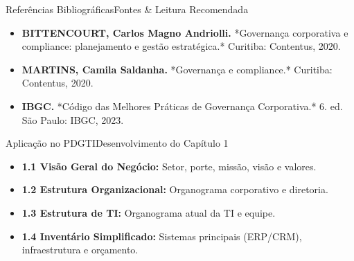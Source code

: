 \begin{senaiframe}{Referências Bibliográficas}{Fontes \& Leitura Recomendada}
  \begin{tcolorbox}[senaicard, title={Obras de Referência}]
    \begin{itemize}
      \item \textbf{BITTENCOURT, Carlos Magno Andriolli.} *Governança corporativa e compliance: planejamento e gestão estratégica.* Curitiba: Contentus, 2020.
      \item \textbf{MARTINS, Camila Saldanha.} *Governança e compliance.* Curitiba: Contentus, 2020.
      \item \textbf{IBGC.} *Código das Melhores Práticas de Governança Corporativa.* 6. ed. São Paulo: IBGC, 2023.
    \end{itemize}
  \end{tcolorbox}
\end{senaiframe}

\begin{senaiframe}{Aplicação no PDGTI}{Desenvolvimento do Capítulo 1}
  \vspace{0.2cm}
  \begin{tcolorbox}[senaigreencard, title={Capítulo 1 – Caracterização da Organização}]
    \begin{itemize}
      \item \textbf{1.1 Visão Geral do Negócio:} Setor, porte, missão, visão e valores.
      \item \textbf{1.2 Estrutura Organizacional:} Organograma corporativo e diretoria.
      \item \textbf{1.3 Estrutura de TI:} Organograma atual da TI e equipe.
      \item \textbf{1.4 Inventário Simplificado:} Sistemas principais (ERP/CRM), infraestrutura e orçamento.
    \end{itemize}
  \end{tcolorbox}
\end{senaiframe}

